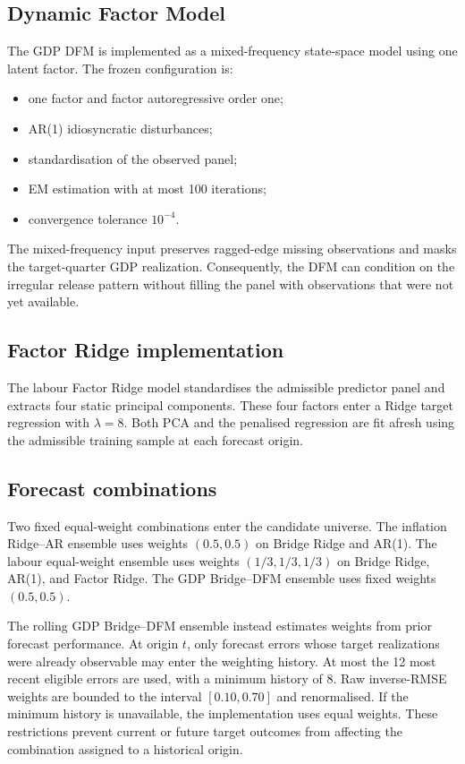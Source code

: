 \subsection{Dynamic Factor Model}

The GDP DFM is implemented as a mixed-frequency state-space model using one
latent factor. The frozen configuration is:
\begin{itemize}[leftmargin=*]
    \item one factor and factor autoregressive order one;
    \item AR(1) idiosyncratic disturbances;
    \item standardisation of the observed panel;
    \item EM estimation with at most 100 iterations;
    \item convergence tolerance \(10^{-4}\).
\end{itemize}
The mixed-frequency input preserves ragged-edge missing observations and masks
the target-quarter GDP realization. Consequently, the DFM can condition on the
irregular release pattern without filling the panel with observations that
were not yet available.

\subsection{Factor Ridge implementation}

The labour Factor Ridge model standardises the admissible predictor panel and
extracts four static principal components. These four factors enter a Ridge
target regression with \(\lambda=8\). Both PCA and the penalised regression are
fit afresh using the admissible training sample at each forecast origin.

\subsection{Forecast combinations}

Two fixed equal-weight combinations enter the candidate universe. The
inflation Ridge--AR ensemble uses weights \((0.5,0.5)\) on Bridge Ridge and
AR(1). The labour equal-weight ensemble uses weights \((1/3,1/3,1/3)\) on
Bridge Ridge, AR(1), and Factor Ridge. The GDP Bridge--DFM ensemble uses fixed
weights \((0.5,0.5)\).

The rolling GDP Bridge--DFM ensemble instead estimates weights from prior
forecast performance. At origin \(t\), only forecast errors whose target
realizations were already observable may enter the weighting history. At most
the 12 most recent eligible errors are used, with a minimum history of 8.
Raw inverse-RMSE weights are bounded to the interval \([0.10,0.70]\) and
renormalised. If the minimum history is unavailable, the implementation uses
equal weights. These restrictions prevent current or future target outcomes
from affecting the combination assigned to a historical origin.

